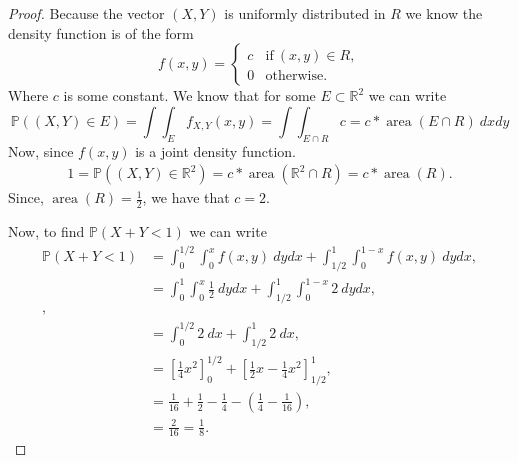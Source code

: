 \documentclass{article}
\newcommand{\R}{\mathbb{R}}
\renewcommand{\P}[1]{\mathbb{P}(#1)}
\DeclareMathOperator{\area}{area}
\begin{document}
\begin{proof}
    Because the vector $(X,Y)$ is uniformly distributed in $R$ we know
    the density function is of the form
    \begin{equation*}
        f(x,y) = \begin{cases}
            c & \text{if} \ (x,y) \in R, \\
            0 & \text{otherwise}.
        \end{cases}
    \end{equation*}
    Where $c$ is some constant. We know that for some $E\subset \R^2$ we can
    write
    \begin{equation*}
        \P{(X,Y) \in E} = \int\int_{E} f_{X,Y}(x,y)
        = \int\int_{E\cap R} c = c*\area(E\cap R)\ dxdy
    \end{equation*}
    Now, since $f(x,y)$ is a joint density function.
    \begin{align*}
        1 = \P{(X,Y) \in \R^2} = c*\area(\R^2 \cap R) = c*\area(R).
    \end{align*}
    Since, $\area(R) = \frac{1}{2}$, we have that $c = 2$.

    Now, to find $\P{X+Y < 1}$ we can write
    \begin{align*}
        \P{X + Y < 1} & = \int_0^{1/2}\int_0^x f(x,y) \ dydx
        + \int_{1/2}^{1}\int_0^{1-x} f(x,y) \ dydx,                \\
                      & = \int_0^1\int_0^x \frac{1}{2} \ dydx
        +\int_{1/2}^{1}\int_0^{1-x} 2 \ dydx,            \\ , \\
                      & = \int_0^{1/2} 2 \ dx
        + \int_{1/2}^1 2 \ dx,                      \\
                      & = \left[\frac{1}{4}x^2 \right]_0^{1/2}
        + \left[\frac{1}{2}x - \frac{1}{4}x^2 \right]_{1/2}^1,     \\
                      & = \frac{1}{16} + \frac{1}{2} - \frac{1}{4}
        - \left(\frac{1}{4} - \frac{1}{16}\right),                 \\
                      & = \frac{2}{16} = \frac{1}{8}.
    \end{align*}
\end{proof}
\end{document}
